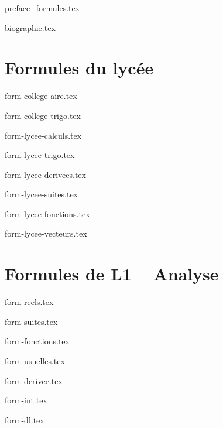 \documentclass[10pt,a4paper]{article}
\begin{document}
{preface_formules.tex}



{biographie.tex}

\clearpage
\part{Formules du lycée}
	
{form-college-aire.tex}

{form-college-trigo.tex}

{form-lycee-calculs.tex}

{form-lycee-trigo.tex}

{form-lycee-derivees.tex}

{form-lycee-suites.tex}

{form-lycee-fonctions.tex}

{form-lycee-vecteurs.tex}

\clearpage
\part{Formules de L1 -- Analyse}


{form-reels.tex}

{form-suites.tex}

{form-fonctions.tex}

{form-usuelles.tex}

{form-derivee.tex}


{form-int.tex}

{form-dl.tex}
\end{document}
